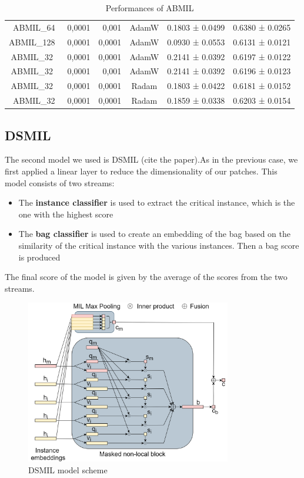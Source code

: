 \documentclass{article}
\begin{document}
\begin{table}[h]
\begin{tabular}{|ccrc|c|c|}
		ABMIL\_64 & 0,0001 & 0,001 & AdamW & 0.1803 ± 0.0499 & 0.6380 ± 0.0265\\
		ABMIL\_128\ & 0,0001 & 0,0001 & AdamW & 0.0930 ± 0.0553&0.6131 ± 0.0121\\
		ABMIL\_32\ & 0,0001 & 0,0001 & AdamW &  0.2141 ± 0.0392&0.6197 ± 0.0122\\
		ABMIL\_32\ & 0,0001 & 0,001 & AdamW & 0.2141 ± 0.0392&0.6196 ± 0.0123\\
		ABMIL\_32\ & 0,0001 & 0,0001 & Radam & 0.1803 ± 0.0422&0.6181 ± 0.0152\\
		ABMIL\_32 & 0,0001 & 0,0001 & Radam & 0.1859 ± 0.0338&0.6203 ± 0.0154\\
		\hline
	\end{tabular}
	\caption{Performances of ABMIL }
\end{table}


\clearpage
\subsection{DSMIL}
The second model we used is DSMIL (cite the paper).As in the previous case, we first applied a linear layer to reduce the dimensionality of our patches.
This model consists of two streams:
\begin{itemize}
	\item The \textbf{instance classifier} is used to extract the critical instance, which is the one with the highest score
	\item The \textbf{bag classifier} is used to create an embedding of the bag based on the similarity of the critical instance with the various instances. Then a bag score is produced
\end{itemize}
The final score of the model is given by the average of the scores from the two streams.

\begin{figure}[h]
	\centering
	\includegraphics[width=0.8\textwidth]{images/dsmil.png}
	\caption{DSMIL model scheme}
\end{figure}
\end{document}
